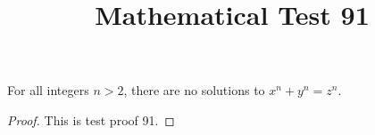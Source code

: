 \documentclass{amsart}
\begin{document}
\title{Mathematical Test 91}
\begin{theorem}
For all integers $n > 2$, there are no solutions to $x^n + y^n = z^n$.
\end{theorem}
\begin{proof}
This is test proof 91.
\end{proof}
\end{document}
